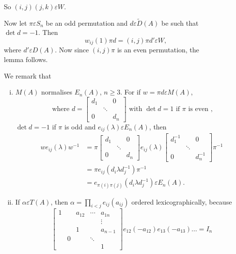 \begin{Proof}
So $(i,j)(j,k)\varepsilon W$. 

Now let $\pi \varepsilon S_n$ be an odd permutation and $d\varepsilon
\tilde{D}(A)$ be such that \\$\det d=-1$. Then 
$$
w_{ij}(1)\pi d=(i,j)\pi d'\varepsilon W,
$$
where $d'\varepsilon D(A)$. Now since $(i,j)\pi$ is an even
permutation, the\\ lemma follows.
\enprf
\end{Proof}

We remark that 
\begin{enumerate}[(i)]
\item $M(A)$ normalises $E_n(A)$, $n\geq 3$. For  if $w=\pi d
  \varepsilon M(A)$, 
$$
\text{ where } d=\begin{bmatrix}
d_1 & & 0\\
& \ddots \\
0 & &d_n
\end{bmatrix} \text{ with }\det d=1 \text{ if } \pi \text{ is even },
$$
$\det d=-1$ if $\pi$ is odd and $e_{ij}(\lambda)\varepsilon E_n(A)$,
then 
\begin{align*}
we_{ij}(\lambda)w^{-1} &=\pi\begin{bmatrix}
d_1 && 0\\
& \ddots &\\
0 && d_n
\end{bmatrix} e_{ij}(\lambda) \begin{bmatrix}
d^{-1}_1 && 0\\
& \ddots &\\
0 && d^{-1}_n
\end{bmatrix}\pi^{-1}\\
&=\pi e_{ij}\left(d_i\lambda d^{-1}_j\right)\pi^{-1}\\
&=e_{\pi(i)\pi(j)}\left(d_i\lambda d^{-1}_j\right)\varepsilon E_n(A).
\end{align*}

\item If $\alpha \varepsilon T(A)$, then
  $\alpha=\prod\limits_{i<j}e_{ij}(a_{ij})$ ordered lexicographically,
  because
$$
\begin{bmatrix}
1 & &a_{12}&\cdots &a_{1n}\\
& & & &\vdots\\
& &1 & &a_{n-1}\\
& 0 & &\ddots  \\
& & & &1
\end{bmatrix}e_{12}(-a_{12})e_{13}(-a_{13})\ldots = I_n
$$
\end{enumerate}


